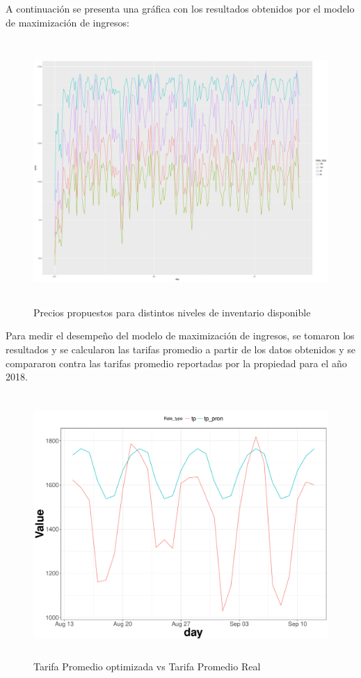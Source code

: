 A continuación se presenta una gráfica con los resultados obtenidos por el modelo de maximización de ingresos:

\begin{figure}[H]
  \centering
      \includegraphics[width=\maxwidth,height=10cm]{figures/Pricing_graph-1}  
  \caption{Precios propuestos para distintos niveles de inventario disponible}
\end{figure}


Para medir el desempeño del modelo de maximización de ingresos, se tomaron los resultados y se calcularon las tarifas promedio a partir de los datos obtenidos y se compararon contra las tarifas promedio reportadas por la propiedad para el año 2018.

\begin{figure}[H]
  \centering
      \includegraphics[width=\maxwidth,height=10cm]{figures/Pricing-1}  
  \caption{Tarifa Promedio optimizada vs Tarifa Promedio Real}
\end{figure}


